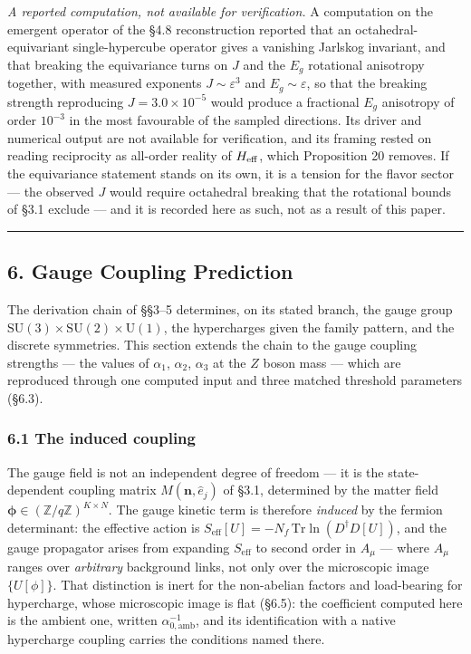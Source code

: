 \documentclass[
]{article}
\begin{document}
\emph{A reported computation, not available for verification.} A
computation on the emergent operator of the §4.8 reconstruction reported
that an octahedral-equivariant single-hypercube operator gives a
vanishing Jarlskog invariant, and that breaking the equivariance turns
on \(J\) and the \(E_g\) rotational anisotropy together, with measured
exponents \(J \sim \varepsilon^{3}\) and \(E_g \sim \varepsilon\), so
that the breaking strength reproducing \(J = 3.0\times10^{-5}\) would
produce a fractional \(E_g\) anisotropy of order \(10^{-3}\) in the most
favourable of the sampled directions. Its driver and numerical output
are not available for verification, and its framing rested on reading
reciprocity as all-order reality of \(H_{\rm eff}\), which Proposition
20 removes. If the equivariance statement stands on its own, it is a
tension for the flavor sector --- the observed \(J\) would require
octahedral breaking that the rotational bounds of §3.1 exclude --- and
it is recorded here as such, not as a result of this paper.

\begin{center}\rule{0.5\linewidth}{0.5pt}\end{center}

\hypertarget{gauge-coupling-prediction}{%
\subsection{6. Gauge Coupling
Prediction}\label{gauge-coupling-prediction}}

The derivation chain of §§3--5 determines, on its stated branch, the
gauge group
\(\mathrm{SU}(3) \times \mathrm{SU}(2) \times \mathrm{U}(1)\), the
hypercharges given the family pattern, and the discrete symmetries. This
section extends the chain to the gauge coupling strengths --- the values
of \(\alpha_1\), \(\alpha_2\), \(\alpha_3\) at the \(Z\) boson mass ---
which are reproduced through one computed input and three matched
threshold parameters (§6.3).

\hypertarget{the-induced-coupling}{%
\subsubsection{6.1 The induced coupling}\label{the-induced-coupling}}

The gauge field is not an independent degree of freedom --- it is the
state-dependent coupling matrix \(M(\mathbf{n}, \hat{e}_j)\) of §3.1,
determined by the matter field
\(\boldsymbol{\phi} \in (\mathbb{Z}/q\mathbb{Z})^{K \times N}\). The
gauge kinetic term is therefore \emph{induced} by the fermion
determinant: the effective action is
\(S_{\text{eff}}[U] = -N_f \, \mathrm{Tr} \ln(D^\dagger D[U])\), and the
gauge propagator arises from expanding \(S_{\text{eff}}\) to second
order in \(A_\mu\) --- where \(A_\mu\) ranges over \emph{arbitrary}
background links, not only over the microscopic image \(\{U[\phi]\}\).
That distinction is inert for the non-abelian factors and load-bearing
for hypercharge, whose microscopic image is flat (§6.5): the coefficient
computed here is the ambient one, written
\(\alpha^{-1}_{0,\mathrm{amb}}\), and its identification with a native
hypercharge coupling carries the conditions named there.
\end{document}
